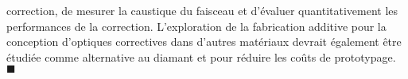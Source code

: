 \begin{refsection}
correction, de mesurer la caustique du faisceau et d'évaluer quantitativement les performances de la correction. L'exploration de la fabrication additive pour la conception d'optiques correctives dans d'autres matériaux devrait également être étudiée comme alternative au diamant et pour réduire les coûts de prototypage. $\blacksquare$

\printbibliography[heading=subbibliography]
\end{refsection}